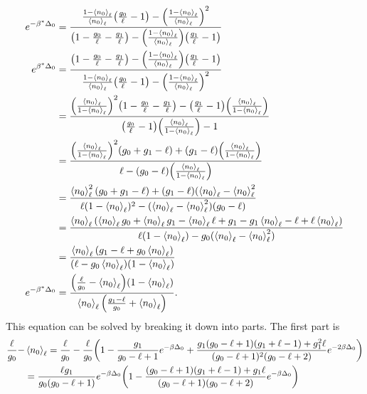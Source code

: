 \begin{align}
    e^{-\beta^*\Delta_0}&=\frac{\frac{1-\left<{n_0}\right>_\ell}{\left<{n_0}\right>_\ell}\qty(\frac{g_0}{\ell}-1)-\qty(\frac{1-\left<{n_0}\right>_\ell}{\left<{n_0}\right>_\ell})^2}{\qty(1-\frac{g_0}{\ell}-\frac{g_1}{\ell})-\qty(\frac{1-\left<{n_0}\right>_\ell}{\left<{n_0}\right>_\ell})\qty(\frac{g_1}{\ell}-1)}\\
    e^{\beta^*\Delta_0}&=\frac{\qty(1-\frac{g_0}{\ell}-\frac{g_1}{\ell})-\qty(\frac{1-\left<{n_0}\right>_\ell}{\left<{n_0}\right>_\ell})\qty(\frac{g_1}{\ell}-1)}{\frac{1-\left<{n_0}\right>_\ell}{\left<{n_0}\right>_\ell}\qty(\frac{g_0}{\ell}-1)-\qty(\frac{1-\left<{n_0}\right>_\ell}{\left<{n_0}\right>_\ell})^2}\nonumber\\
    &=\frac{\qty(\frac{\left<{n_0}\right>_\ell}{1-\left<{n_0}\right>_\ell})^2\qty(1-\frac{g_0}{\ell}-\frac{g_1}{\ell})-\qty(\frac{g_1}{\ell}-1)\qty(\frac{\left<{n_0}\right>_\ell}{1-\left<{n_0}\right>_\ell})}{\qty(\frac{g_0}{\ell}-1)\qty(\frac{\left<{n_0}\right>_\ell}{1-\left<{n_0}\right>_\ell})-1}\nonumber\\
    &=\frac{\qty(\frac{\left<{n_0}\right>_\ell}{1-\left<{n_0}\right>_\ell})^2(g_0+g_1-\ell)+(g_1-\ell)\qty(\frac{\left<{n_0}\right>_\ell}{1-\left<{n_0}\right>_\ell})}{\ell-(g_0-\ell)\qty(\frac{\left<{n_0}\right>_\ell}{1-\left<{n_0}\right>_\ell})}\nonumber\\
    &=\frac{\left<{n_0}\right>_\ell^2(g_0+g_1-\ell)+(g_1-\ell)(\left<{n_0}\right>_\ell-\left<{n_0}\right>_\ell^2}{\ell(1-\left<{n_0}\right>_\ell)^2-(\left<{n_0}\right>_\ell-\left<{n_0}\right>_\ell^2)(g_0-\ell)}\nonumber\\
    &=\frac{\left<{n_0}\right>_\ell\qty(\left<{n_0}\right>_\ell g_0+\left<{n_0}\right>_\ell g_1-\left<{n_0}\right>_\ell \ell+g_1-g_1\left<{n_0}\right>_\ell-\ell+\ell\left<{n_0}\right>_\ell)}{\ell(1-\left<{n_0}\right>_\ell)-g_0(\left<{n_0}\right>_\ell-\left<{n_0}\right>_\ell^2)}\nonumber\\
    &=\frac{\left<{n_0}\right>_\ell(g_1-\ell+g_0\left<{n_0}\right>_\ell)}{(\ell-g_0\left<{n_0}\right>_\ell)(1-\left<{n_0}\right>_\ell)}\\
    e^{-\beta^*\Delta_0}&=\frac{\qty(\frac{\ell}{g_0}-\left<{n_0}\right>_\ell)\qty(1-\left<{n_0}\right>_\ell)}{\left<{n_0}\right>_\ell\qty(\frac{g_1-\ell}{g_0}+\left<{n_0}\right>_\ell)}. \label{C.16}
\end{align}
This equation can be solved by breaking it down into parts. The first part is  
\begin{align}
    \frac{\ell}{g_0}-&\left<{n_0}\right>_\ell=\frac{\ell}{g_0}-\frac{\ell}{g_0}\qty(1-\frac{g_1}{g_0-\ell+1}e^{-\beta\Delta_0}+\frac{g_1(g_0-\ell+1)(g_1+\ell-1)+g_1^2 \ell}{(g_0-\ell+1)^2(g_0-\ell+2)} e^{-2\beta\Delta_0})\nonumber\\
    &=\frac{\ell g_1}{g_0(g_0-\ell+1)}e^{-\beta\Delta_0}\qty(1-\frac{(g_0-\ell+1)(g_1+\ell-1)+g_1\ell}{(g_0-\ell+1)(g_0-\ell+2)}e^{-\beta\Delta_0})\nonumber
\end{align}

